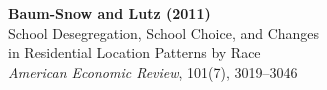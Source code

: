 \documentclass[12pt]{article}
\begin{document}
\begin{center}
{\Large\bfseries Baum-Snow and Lutz (2011)}\\
{\large School Desegregation, School Choice, and Changes}\\
{\large in Residential Location Patterns by Race}\\
\vspace{0.5em}
{\normalsize \textit{American Economic Review}, 101(7), 3019--3046}
\end{center}

\vspace{1em}




\end{document}
